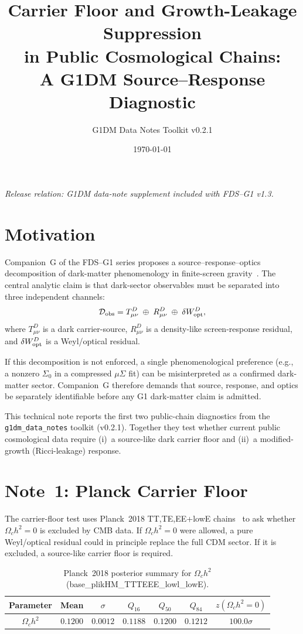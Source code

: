 \documentclass[11pt]{article}
\title{Carrier Floor and Growth-Leakage Suppression\\in Public Cosmological Chains:\\
A G1DM Source--Response Diagnostic}
\author{G1DM Data Notes Toolkit v0.2.1}
\date{\today}
\begin{document}
\maketitle

\noindent\textit{Release relation: G1DM data-note supplement included with FDS--G1 v1.3.}

\section{Motivation}

Companion~G of the FDS--G1 series proposes a source--response--optics decomposition
of dark-matter phenomenology in finite-screen gravity~\cite{FDSG1}.  The central
analytic claim is that dark-sector observables must be separated into three
independent channels:
\begin{equation}
\mathcal D_{\rm obs}
=
T_{\mu\nu}^{D}\;\oplus\; R_{\mu\nu}^{D}\;\oplus\; \delta W_{\rm opt}^{D},
\end{equation}
where $T_{\mu\nu}^{D}$ is a dark carrier-source, $R_{\mu\nu}^{D}$ is a
density-like screen-response residual, and $\delta W_{\rm opt}^{D}$ is a
Weyl/optical residual.

If this decomposition is not enforced, a single phenomenological preference (e.g., a
nonzero $\Sigma_0$ in a compressed $\mu\Sigma$ fit) can be misinterpreted as a
confirmed dark-matter sector.  Companion~G therefore demands that source, response,
and optics be separately identifiable before any G1 dark-matter claim is admitted.

This technical note reports the first two public-chain diagnostics from the
\texttt{g1dm\_data\_notes} toolkit (v0.2.1).  Together they test whether
current public cosmological data require (i)~a source-like dark carrier floor
and (ii)~a modified-growth (Ricci-leakage) response.

\section{Note~1: Planck Carrier Floor}

The carrier-floor test uses Planck~2018 TT,TE,EE+lowE chains~\cite{Planck2018} to
ask whether $\Omega_c h^2=0$ is excluded by CMB data.  If
$\Omega_c h^2=0$ were allowed, a pure Weyl/optical residual could in principle
replace the full CDM sector.  If it is excluded, a source-like carrier floor is
required.

\begin{table}[h]
\centering
\caption{Planck~2018 posterior summary for $\Omega_c h^2$
(base\_plikHM\_TTTEEE\_lowl\_lowE).}\label{tab:note1}
\begin{tabular}{ccccccc}
\toprule
Parameter & Mean & $\sigma$ & $Q_{16}$ & $Q_{50}$ & $Q_{84}$ & $z(\Omega_c h^2{=}0)$ \\
\midrule
$\Omega_c h^2$ & $0.1200$ & $0.0012$ & $0.1188$ & $0.1200$ & $0.1212$ & $100.0\sigma$ \\
\bottomrule
\end{tabular}
\end{table}
\end{document}
